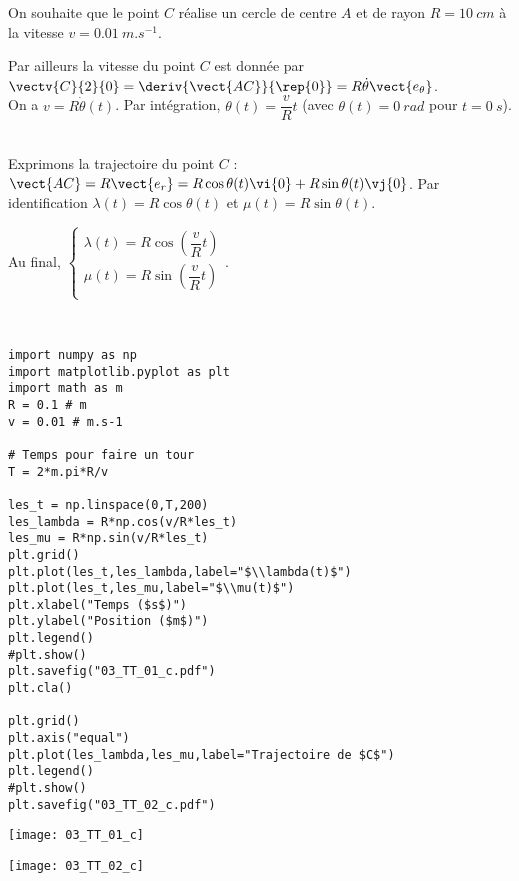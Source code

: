 On souhaite que le point $C$ réalise un cercle de centre $A$ et de rayon $R=\SI{10}{cm}$ à la vitesse $v=\SI{0,01}{m.s^{-1}}$. 


Par ailleurs la vitesse du point $C$ est donnée par $\vectv{C}{2}{0}=\deriv{\vect{AC}}{\rep{0}} = R\dot{\theta}\vect{e_\theta}$. 
\ifprof  ~\\
On a $v=R\dot{\theta}(t)$. Par intégration, $ \theta(t)=\dfrac{v}{R}t$ (avec $\theta(t)=\SI{0}{rad}$ pour $t=\SI{0}{s}$).

\else
\fi

\ifprof  ~\\
Exprimons la trajectoire du point $C$ : $\vect{AC}=R\vect{e_r} = R\cos\theta(t) \vi{0}+ R\sin\theta(t)  \vj{0}$. Par identification 
$ \lambda(t) = R\cos\theta(t)$ et $\mu(t) = R\sin\theta(t)$.

Au final, 
$\left\{
\begin{array}{l}
\lambda(t) = R\cos\left( \dfrac{v}{R}t\right)\\
\mu(t) = R\sin\left( \dfrac{v}{R}t\right)\\
\end{array}
\right.
$.

\else
\fi


\ifprof
~\\

\begin{lstlisting}
import numpy as np
import matplotlib.pyplot as plt
import math as m
R = 0.1 # m
v = 0.01 # m.s-1 

# Temps pour faire un tour 
T = 2*m.pi*R/v

les_t = np.linspace(0,T,200)
les_lambda = R*np.cos(v/R*les_t)
les_mu = R*np.sin(v/R*les_t)
plt.grid()
plt.plot(les_t,les_lambda,label="$\\lambda(t)$")
plt.plot(les_t,les_mu,label="$\\mu(t)$")
plt.xlabel("Temps ($s$)")
plt.ylabel("Position ($m$)")
plt.legend()
#plt.show()
plt.savefig("03_TT_01_c.pdf")
plt.cla()

plt.grid()
plt.axis("equal")
plt.plot(les_lambda,les_mu,label="Trajectoire de $C$")
plt.legend()
#plt.show()
plt.savefig("03_TT_02_c.pdf")
\end{lstlisting}



\begin{marginfigure}
\texttt{[image: 03\_TT\_01\_c]}
\end{marginfigure}

\begin{marginfigure}
\texttt{[image: 03\_TT\_02\_c]}
\end{marginfigure}

\else
\fi
